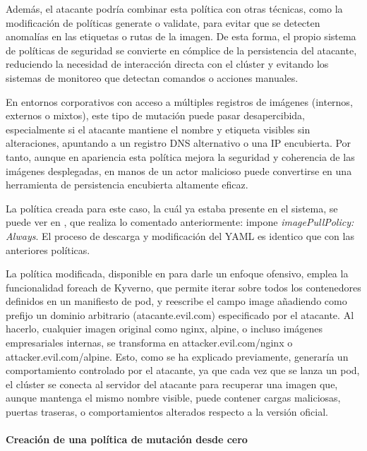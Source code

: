 \documentclass[12pt,twoside,titlepage]{report}
\begin{document}
Además, el atacante podría combinar esta política con otras técnicas, como la modificación de políticas generate o validate, para evitar que se detecten anomalías en las etiquetas o rutas de la imagen. De esta forma, el propio sistema de políticas de seguridad se convierte en cómplice de la persistencia del atacante, reduciendo la necesidad de interacción directa con el clúster y evitando los sistemas de monitoreo que detectan comandos o acciones manuales.

En entornos corporativos con acceso a múltiples registros de imágenes (internos, externos o mixtos), este tipo de mutación puede pasar desapercibida, especialmente si el atacante mantiene el nombre y etiqueta visibles sin alteraciones, apuntando a un registro DNS alternativo o una IP encubierta. Por tanto, aunque en apariencia esta política mejora la seguridad y coherencia de las imágenes desplegadas, en manos de un actor malicioso puede convertirse en una herramienta de persistencia encubierta altamente eficaz.

La política creada para este caso, la cuál ya estaba presente en el sistema, se puede ver en , que realiza lo comentado anteriormente: impone \textit{imagePullPolicy: Always}. El proceso de descarga y modificación del YAML es identico que con las anteriores políticas.

La política modificada, disponible en  para darle un enfoque ofensivo, emplea la funcionalidad foreach de Kyverno, que permite iterar sobre todos los contenedores definidos en un manifiesto de pod, y reescribe el campo image añadiendo como prefijo un dominio arbitrario (atacante.evil.com) especificado por el atacante. Al hacerlo, cualquier imagen original como nginx, alpine, o incluso imágenes empresariales internas, se transforma en attacker.evil.com/nginx o attacker.evil.com/alpine. Esto, como se ha explicado previamente, generaría un comportamiento controlado por el atacante, ya que cada vez que se lanza un pod, el clúster se conecta al servidor del atacante para recuperar una imagen que, aunque mantenga el mismo nombre visible, puede contener cargas maliciosas, puertas traseras, o comportamientos alterados respecto a la versión oficial.


\paragraph{Creación de una política de mutación desde cero \\ \\}
\end{document}
